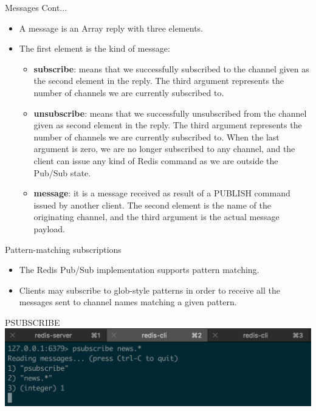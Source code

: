 \documentclass[10pt]{beamer}
\begin{document}
\begin{frame}[fragile]{Messages Cont...}
  \begin{itemize}
    \item A message is an Array reply with three elements.
    \item The first element is the kind of message:
      \begin{itemize}
        \item \textbf{subscribe}: means that we successfully subscribed to the
        channel given as the second element in the reply. The third argument
        represents the number of channels we are currently subscribed to.
        \item \textbf{unsubscribe}: means that we successfully unsubscribed from
        the channel given as second element in the reply. The third argument
        represents the number of channels we are currently subscribed to. When
        the last argument is zero, we are no longer subscribed to any channel,
        and the client can issue any kind of Redis command as we are outside the
        Pub/Sub state.
        \item \textbf{message}: it is a message received as result of a PUBLISH
        command issued by another client. The second element is the name of the
        originating channel, and the third argument is the actual message
        payload.
      \end{itemize}
  \end{itemize}
\end{frame}

\begin{frame}[fragile]{Pattern-matching subscriptions}
  \begin{itemize}
    \item The Redis Pub/Sub implementation supports pattern matching.
    \item Clients may subscribe to glob-style patterns in order to receive all
    the messages sent to channel names matching a given pattern.
  \end{itemize}
\end{frame}

\begin{frame}[fragile]{PSUBSCRIBE}
  \includegraphics[scale=0.5]{img/psubscribe}
\end{frame}
\end{document}
